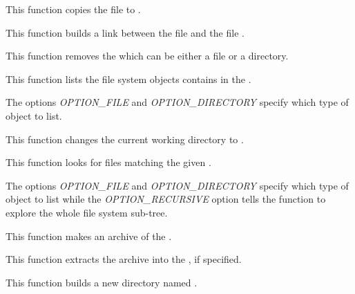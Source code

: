          {
	   This function copies the file  to
	   .
	 }

         {
	   This function builds a link between the file 
	   and the file .
	 }

         {
	   This function removes the  which can be either
	   a file or a directory.
	 }

         {
	   This function lists the file system objects contains in the
	   .

	   \-

	   The options \textit{OPTION\_FILE} and \textit{OPTION\_DIRECTORY}
	   specify which type of object to list.
	 }

         {
	   This function changes the current working directory to
	   .
	 }

         {
	   This function looks for files matching the given .

	   \-

	   The options \textit{OPTION\_FILE} and \textit{OPTION\_DIRECTORY}
	   specify which type of object to list while the
	   \textit{OPTION\_RECURSIVE} option tells the function to explore
	   the whole file system sub-tree.
	 }

         {
	   This function makes an archive  of the
	   .
	 }

         {
	   This function extracts the archive  into the
	   , if specified.
	 }

         {
	   This function builds a new directory named .
	 }

